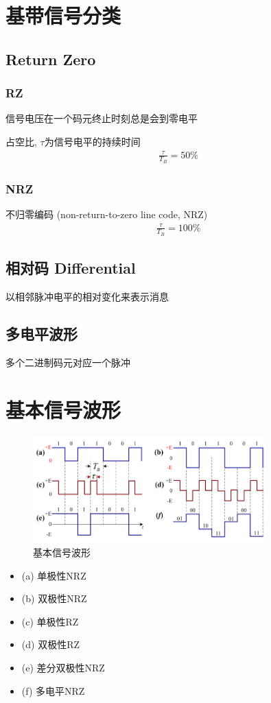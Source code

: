 \documentclass[a4paper]{report}
\begin{document}
\section{基带信号分类}
\subsection{Return Zero}
\subsubsection{RZ}
信号电压在一个码元终止时刻总是会到零电平

占空比, $\tau$为信号电平的持续时间
\begin{align*}
  \frac{\tau}{T_B}=50\%
\end{align*}
\subsubsection{NRZ}
不归零编码 (non-return-to-zero line code, NRZ) 
\begin{align*}
  \frac{\tau}{T_B}=100\%
\end{align*}
\subsection{相对码 Differential}
以相邻脉冲电平的相对变化来表示消息
\subsection{多电平波形}
多个二进制码元对应一个脉冲
\section{基本信号波形}
\begin{figure}[H]
\centering
\includegraphics[width=0.8\textwidth]{baseband_signal.png}
\caption{基本信号波形}
\end{figure}
\begin{itemize}
  \item (a) 单极性NRZ
  \item (b) 双极性NRZ
  \item (c) 单极性RZ
  \item (d) 双极性RZ
  \item (e) 差分双极性NRZ
  \item (f) 多电平NRZ
\end{itemize}
\end{document}

